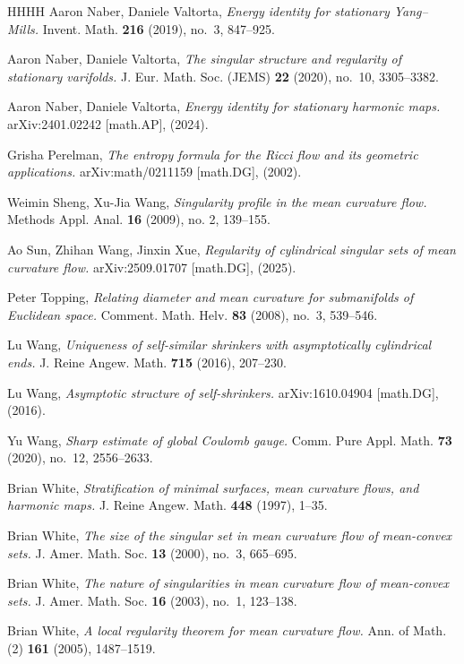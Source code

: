 \documentclass[11pt,reqno]{amsart}
\numberwithin{equation}{section}
\theoremstyle{definition}
\theoremstyle{remark}
\theoremstyle{remark}
\theoremstyle{remark}
\theoremstyle{remark}\newtheorem{conjecture}[equation]{Conjecture}
\theoremstyle{remark}\newtheorem{question}[equation]{Question}
\begin{document}
\begin{thebibliography}{HHHH}
Aaron Naber, Daniele Valtorta,
\emph{Energy identity for stationary Yang–Mills.}
Invent. Math. \textbf{216} (2019), no.~3, 847–925.

Aaron Naber, Daniele Valtorta,
\emph{The singular structure and regularity of stationary varifolds.}
J. Eur. Math. Soc. (JEMS) \textbf{22} (2020), no.~10, 3305–3382.

Aaron Naber, Daniele Valtorta,
\emph{Energy identity for stationary harmonic maps.}
arXiv:2401.02242 [math.AP], (2024).

Grisha Perelman,
\emph{The entropy formula for the Ricci flow and its geometric applications.}
arXiv:math/0211159 [math.DG], (2002).

Weimin Sheng, Xu-Jia Wang, \emph{Singularity profile in the mean curvature flow.} Methods Appl. Anal. \textbf{16} (2009), no. 2, 139–155.

Ao Sun, Zhihan Wang, Jinxin Xue,
\emph{Regularity of cylindrical singular sets of mean curvature flow.}
arXiv:2509.01707 [math.DG], (2025).

Peter Topping,
\emph{Relating diameter and mean curvature for submanifolds of Euclidean space.}
Comment. Math. Helv. \textbf{83} (2008), no.~3, 539–546.

Lu Wang,
\emph{Uniqueness of self-similar shrinkers with asymptotically cylindrical ends.}
J. Reine Angew. Math. \textbf{715} (2016), 207–230.

Lu Wang,
\emph{Asymptotic structure of self-shrinkers.}
arXiv:1610.04904 [math.DG], (2016).


Yu Wang,
\emph{Sharp estimate of global Coulomb gauge.}
Comm. Pure Appl. Math. \textbf{73} (2020), no.~12, 2556–2633.


Brian White,
\emph{Stratification of minimal surfaces, mean curvature flows, and harmonic maps.}
J. Reine Angew. Math. \textbf{448} (1997), 1–35.

Brian White,
\emph{The size of the singular set in mean curvature flow of mean-convex sets.}
J. Amer. Math. Soc. \textbf{13} (2000), no.~3, 665–695.

Brian White,
\emph{The nature of singularities in mean curvature flow of mean-convex sets.}
J. Amer. Math. Soc. \textbf{16} (2003), no.~1, 123–138.


Brian White,
\emph{A local regularity theorem for mean curvature flow.}
Ann. of Math. (2) \textbf{161} (2005), 1487–1519.



\end{thebibliography}
\end{document}
